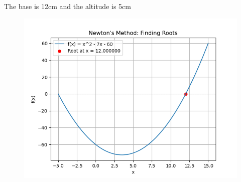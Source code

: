 \documentclass[journal]{IEEEtran}
\begin{document}
The base is 12cm and the altitude is 5cm 
	\begin{figure}[h!]
		\centering
		\includegraphics[width=\columnwidth]{figs/Figure_1.png}
	\end{figure}
	
\end{document}
